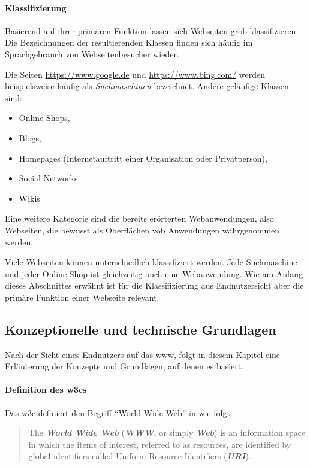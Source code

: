         \paragraph*{Klassifizierung}
        Basierend auf ihrer primären Funktion lassen sich Webseiten grob klassifizieren.
        Die Bezeichnungen der resultierenden Klassen finden sich häufig im Sprachgebrauch
        von Webseitenbesucher wieder.

        Die Seiten \url{https://www.google.de} und \url{https://www.bing.com/}
        werden beispielsweise häufig als \textit{Suchmaschinen} bezeichnet.
        Andere geläufige Klassen sind:

        \begin{itemize}
            \item Online-Shops,
            \item Blogs,
            \item Homepages (Internetauftritt einer Organisation oder Privatperson),
            \item Social Networks
            \item Wikis
        \end{itemize}

        Eine weitere Kategorie sind die bereits erörterten Webanwendungen,
        also Webseiten, die bewusst als Oberflächen vob Anwendungen wahrgenommen werden.

        Viele Webseiten können unterschiedlich klassifiziert werden.
        Jede Suchmaschine und jeder Online-Shop ist gleichzeitig auch eine
        Webanwendung. Wie am Anfang dieses Abschnittes erwähnt ist für die
        Klassifizierung aus Endnutzersicht aber die primäre Funktion einer Webseite
        relevant.

    \subsection{Konzeptionelle und technische Grundlagen}
        Nach der Sicht eines Endnutzers auf das \gls{www},
        folgt in diesem Kapitel eine Erläuterung der Konzepte und Grundlagen,
        auf denen es basiert.

        \paragraph*{Definition des \glspl{w3c}}
        Das \gls{w3c} definiert den Begriff "`World Wide Web"' in \cite{w3c:wwwArch} wie folgt:

        \begin{quote}
            The \textit{\textbf{World Wide Web}} (\textit{\textbf{WWW}}, or simply \textit{\textbf{Web}})
            is an information space in which the items of interest, referred to as resources,
            are identified by global identifiers called Uniform Resource Identifiers (\textit{\textbf{URI}}).
        \end{quote}


